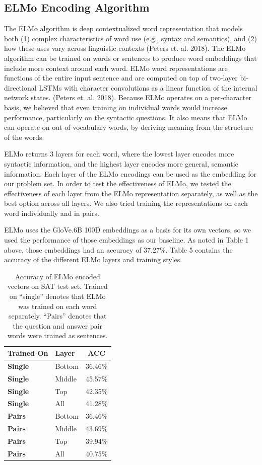 \documentclass[11pt]{article}
\begin{document}
\subsection{ELMo Encoding Algorithm}

The ELMo algorithm is deep contextualized word representation that models both
(1) complex characteristics of word use (e.g., syntax and semantics), and (2)
how these uses vary across linguistic contexts (Peters et. al. 2018). The ELMo
algorithm can be trained on words or sentences to produce word embeddings that
include more context around each word. ELMo word representations are functions
of the entire input sentence and are computed on top of two-layer bi-directional
LSTMs with character convolutions as a linear function of the internal network
states. (Peters et. al. 2018). Because ELMo operates on a per-character basis,
we believed that even training on individual words would increase performance,
particularly on the syntactic questions. It also means that ELMo can operate on
out of vocabulary words, by deriving meaning from the structure of the words.

ELMo returns 3 layers for each word, where the lowest layer encodes more
syntactic information, and the highest layer encodes more general, semantic
information. Each layer of the ELMo encodings can be used as the embedding for
our problem set. In order to test the effectiveness of ELMo, we tested the
effectiveness of each layer from the ELMo representation separately, as well as
the best option across all layers. We also tried training the representations on
each word individually and in pairs. 

ELMo uses the GloVe.6B 100D embeddings as a basis for its own vectors, so we
used the performance of those embeddings as our baseline. As noted in Table 1
above, those embeddings had an accuracy of 37.27\%. Table 5 contains the
accuracy of the different ELMo layers and training styles.

\begin{table}[h]
\begin{center}
\begin{tabular}{|l|lc|}
\hline\bf Trained On & Layer & ACC \\\hline
\bf Single & Bottom & 36.46\% \\
\bf Single & Middle & 45.57\% \\
\bf Single & Top & 42.35\% \\
\bf Single & All & 41.28\% \\
\bf Pairs & Bottom & 36.46\% \\
\bf Pairs & Middle & 43.69\% \\
\bf Pairs & Top & 39.94\% \\
\bf Pairs & All & 40.75\% \\\hline
\end{tabular}
\end{center}
\caption{\label{font-table} Accuracy of ELMo encoded vectors on SAT test set. Trained on ``single'' denotes that ELMo was trained on each word separately. ``Pairs'' denotes that the question and answer pair words were trained as sentences.}
\end{table}
\end{document}
